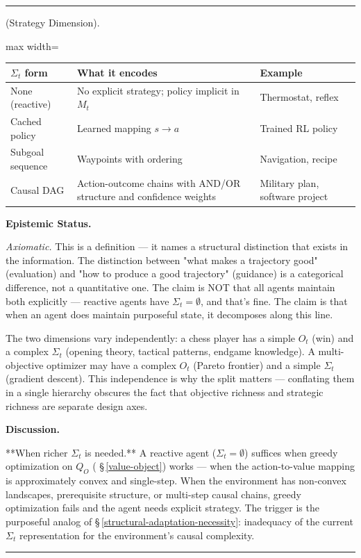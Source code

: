 \documentclass[11pt,oneside]{article}
\newcounter{claim}[section]
\renewcommand{\theclaim}{\thesection.\arabic{claim}}
\newenvironment{segment}[2]{%
  \refstepcounter{claim}%
  \bigskip\noindent\hrule\smallskip
  \noindent{\bfseries #1~\theclaim}\enskip(#2).\par\smallskip
  \noindent\ignorespaces
}{%
  \par\smallskip\noindent\hrule\bigskip
}
\newenvironment{definition}[1][]{\begin{segment}{Definition}{#1}}{\end{segment}}
\begin{document}
\begin{definition}[Strategy Dimension]
\begin{adjustbox}{max width=\textwidth}
\small
\begin{tabular}{lll}
\toprule
$\Sigma_t$ form & What it encodes & Example \\
\midrule
None (reactive) & No explicit strategy; policy implicit in $M_t$ & Thermostat, reflex \\
Cached policy & Learned mapping $s \to a$ & Trained RL policy \\
Subgoal sequence & Waypoints with ordering & Navigation, recipe \\
Causal DAG & Action-outcome chains with AND/OR structure and confidence weights & Military plan, software project \\
\bottomrule
\end{tabular}
\end{adjustbox}



\medskip\noindent\textbf{Epistemic Status.}


\textit{Axiomatic.} This is a definition — it names a structural distinction that exists in the information. The distinction between "what makes a trajectory good" (evaluation) and "how to produce a good trajectory" (guidance) is a categorical difference, not a quantitative one. The claim is NOT that all agents maintain both explicitly — reactive agents have $\Sigma_t = \emptyset$, and that's fine. The claim is that when an agent does maintain purposeful state, it decomposes along this line.

The two dimensions vary independently: a chess player has a simple $O_t$ (win) and a complex $\Sigma_t$ (opening theory, tactical patterns, endgame knowledge). A multi-objective optimizer may have a complex $O_t$ (Pareto frontier) and a simple $\Sigma_t$ (gradient descent). This independence is why the split matters — conflating them in a single hierarchy obscures the fact that objective richness and strategic richness are separate design axes.


\medskip\noindent\textbf{Discussion.}


**When richer $\Sigma_t$ is needed.** A reactive agent ($\Sigma_t = \emptyset$) suffices when greedy optimization on $Q_O$ ( \S\,\ref{value-object}) works — when the action-to-value mapping is approximately convex and single-step. When the environment has non-convex landscapes, prerequisite structure, or multi-step causal chains, greedy optimization fails and the agent needs explicit strategy. The trigger is the purposeful analog of \S\,\ref{structural-adaptation-necessity}: inadequacy of the current $\Sigma_t$ representation for the environment's causal complexity.


\end{definition}
\end{document}

